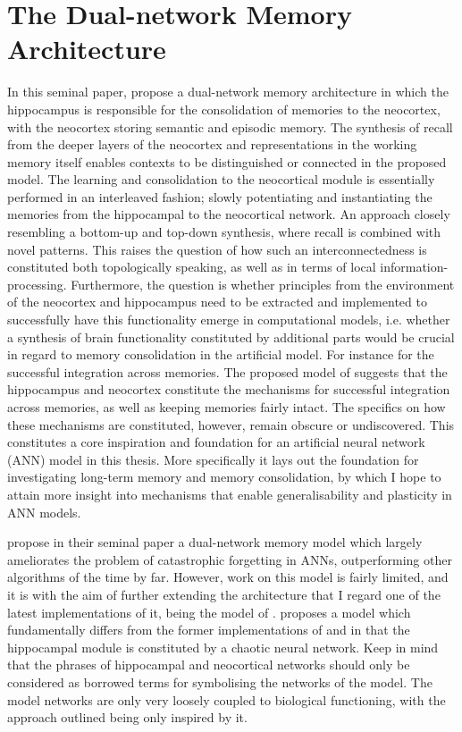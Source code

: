 \section{The Dual-network Memory Architecture}

In this seminal paper, \cite{McClelland1995} propose a dual-network memory architecture in which the hippocampus is responsible for the consolidation of memories to the neocortex, with the neocortex storing semantic and episodic memory. The synthesis of recall from the deeper layers of the neocortex and representations in the working memory itself enables contexts to be distinguished or connected in the proposed model. The learning and consolidation to the neocortical module is essentially performed in an interleaved fashion; slowly potentiating and instantiating the memories from the hippocampal to the neocortical network. An approach closely resembling a bottom-up and top-down synthesis, where recall is combined with novel patterns. This raises the question of how such an interconnectedness is constituted both topologically speaking, as well as in terms of local information-processing. Furthermore, the question is whether principles from the environment of the neocortex and hippocampus need to be extracted and implemented to successfully have this functionality emerge in computational models, i.e. whether a synthesis of brain functionality constituted by additional parts would be crucial in regard to memory consolidation in the artificial model. For instance for the successful integration across memories. The proposed model of \citep{McClelland1995} suggests that the hippocampus and neocortex constitute the mechanisms for successful integration across memories, as well as keeping memories fairly intact. The specifics on how these mechanisms are constituted, however, remain obscure or undiscovered. This constitutes a core inspiration and foundation for an artificial neural network (ANN) model in this thesis. More specifically it lays out the foundation for investigating long-term memory and memory consolidation, by which I hope to attain more insight into mechanisms that enable generalisability and plasticity in ANN models.

\cite{McClelland1995} propose in their seminal paper a dual-network memory model which largely ameliorates the problem of catastrophic forgetting in ANNs, outperforming other algorithms of the time by far. However, work on this model is fairly limited, and it is with the aim of further extending the architecture that I regard one of the latest implementations of it, being the model of \cite{Hattori2014}. \cite{Hattori2010} proposes a model which fundamentally differs from the former implementations of \cite{French1997} and \cite{Ans1997} in that the hippocampal module is constituted by a chaotic neural network. Keep in mind that the phrases of hippocampal and neocortical networks should only be considered as borrowed terms for symbolising the networks of the model. The model networks are only very loosely coupled to biological functioning, with the approach outlined being only inspired by it.

